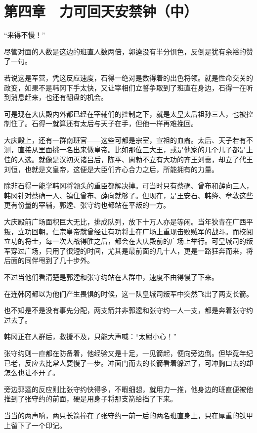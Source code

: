 \section{第四章　力可回天安禁钟（中）}

“来得不慢！”

尽管对面的人数是这边的班直人数两倍，郭逵没有半分惧色，反倒是犹有余裕的赞了一句。

若说这是军营，凭这反应速度，石得一绝对是数得着的出色将领。就是性命交关的政变，如果不是韩冈下手太快，又让宰相们立誓争取到了班直在身边，石得一在听到消息赶来，也还有翻盘的机会。

可是现在大庆殿内外都已经在宰辅们的控制之下，就是太皇太后祖孙三人，也被控制住了。石得一就算还有太后与天子在手，但他一样再难挽回。

大庆殿上，还有一群南班官——这些可都是宗室，宣祖的血裔。太后、天子若有不测，直接从里面挑一名出来做皇帝。比如那位三大王，或是他家的几个儿子都是上佳的人选。就像是汉初灭诸吕后，陈平、周勃不立有大功的齐王刘襄，却立了代王刘恒，也就是文皇帝，这便是大臣们齐心合力之后，所能拥有的力量。

除非石得一能学韩冈将领头的重臣都解决掉。可当时只有蔡确、曾布和薛向三人，韩冈针对蔡确一人、镇住曾布、薛向就够了。但现在，是王安石、韩绛、章敦这些更有份量的宰辅，郭逵、张守约也都站在平叛的一方。

大庆殿前广场面积巨大无比，排成队列，放下十万人亦是等闲。当年狄青在广西平叛，立功回朝。仁宗皇帝就曾经让有功将士在广场上重现击败贼军的战斗。而校阅立功的将士，每一次大战得胜之后，都会在大庆殿前的广场上举行。可皇城司的叛军穿过广场，只用了很短的时间，尤其是最前面的几十人，更是一路狂奔而来，将后面的同伴甩到了几十步外。

不过当他们看清楚是郭逵和张守约站在人群中，速度不由得慢了下来。

在连韩冈都以为他们产生畏惧的时候，这一队皇城司叛军中突然飞出了两支长箭。

也不知是不是没有事先分配，两支箭并非郭逵和张守约一人一支，都是奔着张守约过去了。

韩冈正在人群后，救援不及，只能大声喊：“太尉小心！”

张守约则一直都在防备着，他经验又是十足，一见箭起，便向旁边倒。但毕竟年纪已老，反应去比常人要慢了一步。冲面门而去的长箭看着躲过了，可冲胸口去的却怎么也让不开了。

旁边郭逵的反应则比张守约快得多，不暇细想，就用力一推，他身边的班直便被他推到了张守约的前面，硬是用身子将那支箭给挡了下来。

当当的两声响，两只长箭撞在了张守约一前一后的两名班直身上，只在厚重的铁甲上留下了一个印记。

